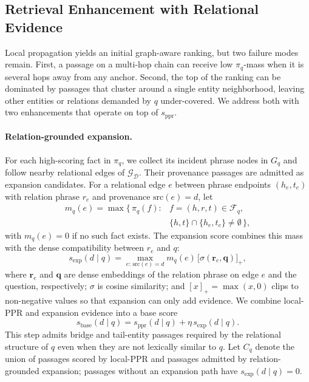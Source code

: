 \subsection{Retrieval Enhancement with Relational Evidence}
\label{sec:method:enhancement}

Local propagation yields an initial graph-aware ranking, but two failure
modes remain. First, a passage on a multi-hop chain can receive low
$\pi_q$-mass when it is several hops away from any anchor. Second, the
top of the ranking can be dominated by passages that cluster around a
single entity neighborhood, leaving other entities or relations demanded
by $q$ under-covered. We address both with two enhancements that operate
on top of $s_{\mathrm{ppr}}$.

\paragraph{Relation-grounded expansion.}
For each high-scoring fact in $\pi_q$, we collect its incident phrase
nodes in $G_q$ and follow nearby relational edges of
$\mathcal{G}_{\mathcal{D}}$. Their provenance passages are admitted as
expansion candidates. For a relational edge $e$ between phrase endpoints
$(h_e, t_e)$ with relation phrase $r_e$ and provenance
$\mathrm{src}(e)=d$, let
\begin{equation}
\label{eq:edge-mass}
\begin{aligned}
m_q(e) = \max\bigl\{\, \pi_q(f) :{}& f=(h,r,t) \in \mathcal{F}_q, \\
& \{h, t\} \cap \{h_e, t_e\} \neq \emptyset \,\bigr\},
\end{aligned}
\end{equation}
with $m_q(e)=0$ if no such fact exists. The expansion score combines this
mass with the dense compatibility between $r_e$ and $q$:
\begin{equation}
\label{eq:expansion-score}
s_{\mathrm{exp}}(d \mid q)
=
\max_{e:\,\mathrm{src}(e)=d}
m_q(e)\,\bigl[\sigma(\mathbf{r}_e,\mathbf{q})\bigr]_{+},
\end{equation}
where $\mathbf{r}_e$ and $\mathbf{q}$ are dense embeddings of the
relation phrase on edge $e$ and the question, respectively; $\sigma$ is
cosine similarity; and $[x]_{+} = \max(x, 0)$ clips to non-negative
values so that expansion can only add evidence. We combine local-PPR and
expansion evidence into a base score
\begin{equation}
\label{eq:base-score}
s_{\mathrm{base}}(d \mid q)
=
s_{\mathrm{ppr}}(d \mid q)
+
\eta\,s_{\mathrm{exp}}(d \mid q).
\end{equation}
This step admits bridge and tail-entity passages required by the
relational structure of $q$ even when they are not lexically similar to
$q$. Let $C_q$ denote the union of passages scored by local-PPR and
passages admitted by relation-grounded expansion; passages without an
expansion path have $s_{\mathrm{exp}}(d \mid q)=0$.

